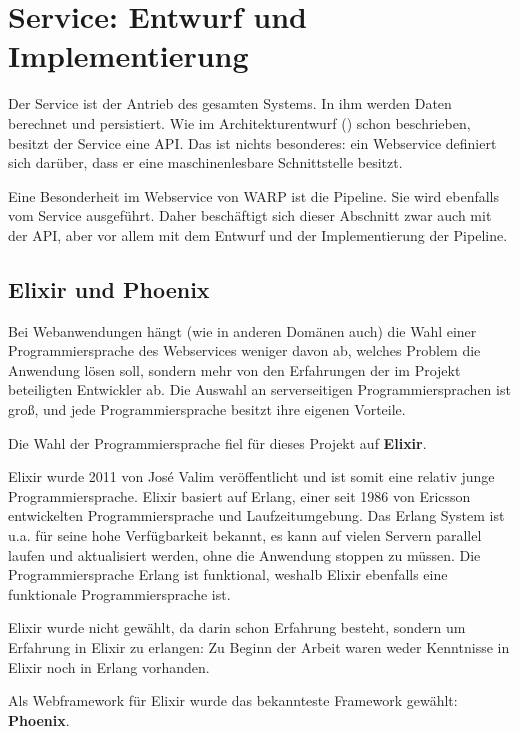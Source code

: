 \section{Service: Entwurf und Implementierung}
\label{sec:service}

Der Service ist der Antrieb des gesamten Systems. In ihm werden Daten berechnet und persistiert. Wie im Architekturentwurf () schon beschrieben, besitzt der Service eine \ac{API}. Das ist nichts besonderes: ein Webservice definiert sich darüber, dass er eine maschinenlesbare Schnittstelle besitzt.

Eine Besonderheit im Webservice von WARP ist die Pipeline. Sie wird ebenfalls vom Service ausgeführt. Daher beschäftigt sich dieser Abschnitt zwar auch mit der \ac{API}, aber vor allem mit dem Entwurf und der Implementierung der Pipeline.

\subsection{Elixir und Phoenix}

Bei Webanwendungen hängt (wie in anderen Domänen auch) die Wahl einer Programmiersprache des Webservices weniger davon ab, welches Problem die Anwendung lösen soll, sondern mehr von den Erfahrungen der im Projekt beteiligten Entwickler ab. Die Auswahl an serverseitigen Programmiersprachen ist groß, und jede Programmiersprache besitzt ihre eigenen Vorteile.

Die Wahl der Programmiersprache fiel für dieses Projekt auf \textbf{Elixir}.

Elixir wurde 2011 von José Valim veröffentlicht und ist somit eine relativ junge Programmiersprache. Elixir basiert auf Erlang, einer seit 1986 von Ericsson entwickelten Programmiersprache und Laufzeitumgebung. Das Erlang System ist u.a. für seine hohe Verfügbarkeit bekannt, es kann auf vielen Servern parallel laufen und aktualisiert werden, ohne die Anwendung stoppen zu müssen. Die Programmiersprache Erlang ist funktional, weshalb Elixir ebenfalls eine funktionale Programmiersprache ist. \citep{wiki:elixir}

Elixir wurde nicht gewählt, da darin schon Erfahrung besteht, sondern um Erfahrung in Elixir zu erlangen: Zu Beginn der Arbeit waren weder Kenntnisse in Elixir noch in Erlang vorhanden.

Als Webframework für Elixir wurde das bekannteste Framework gewählt: \textbf{Phoenix}.

